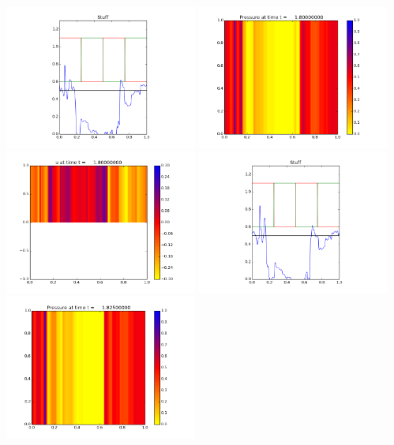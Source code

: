 \documentclass[11pt]{article}
\begin{document}
\vskip 10pt 
\includegraphics[width=0.475\textwidth]{frame0071fig3.png}
\vskip 10pt 
\includegraphics[width=0.475\textwidth]{frame0072fig0.png}
\includegraphics[width=0.475\textwidth]{frame0072fig1.png}
\vskip 10pt 
\includegraphics[width=0.475\textwidth]{frame0072fig3.png}
\vskip 10pt 
\includegraphics[width=0.475\textwidth]{frame0073fig0.png}
\end{document}
